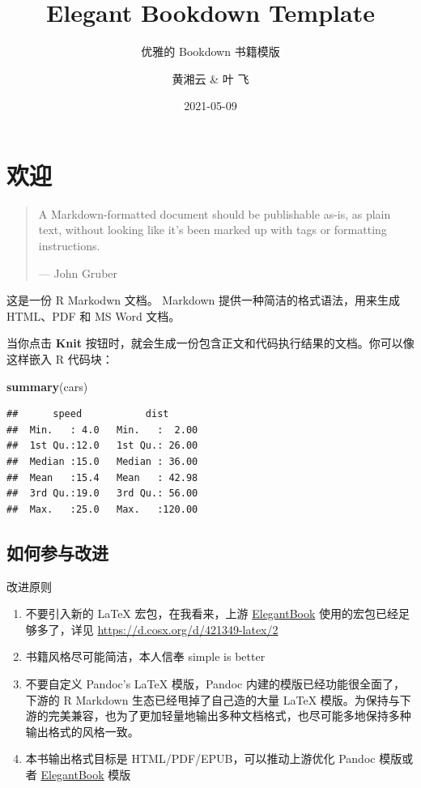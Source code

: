 \documentclass[
  lang=cn,
  11pt,
  scheme=chinese,
  chinesefont=nofont,
  citestyle=gb7714-2015,
  bibstyle=gb7714-2015]{elegantbook}
\institute{A bookdown wrapper for ElegantBook}
\title{Elegant Bookdown Template}
\subtitle{优雅的 Bookdown 书籍模版}
\author{黄湘云 \& 叶 飞}
\date{2021-05-09}
\newenvironment{Shaded}{\begin{snugshade}}{\end{snugshade}}
\newcommand{\KeywordTok}[1]{\textcolor[rgb]{0.13,0.29,0.53}{\textbf{#1}}}
\newcommand{\NormalTok}[1]{#1}
\begin{document}
\maketitle

{
\hypersetup{linkcolor=Maroon}
\setcounter{tocdepth}{2}
\tableofcontents
}
\listoftables
\listoffigures
\mainmatter

\hypertarget{welcome}{%
\chapter{欢迎}\label{welcome}}

\begin{quote}
A Markdown-formatted document should be publishable as-is, as plain text, without looking like it's been marked up with tags or formatting instructions.

\hspace*{\fill} --- John Gruber
\end{quote}

这是一份 R Markodwn 文档。 Markdown 提供一种简洁的格式语法，用来生成 HTML、PDF 和 MS Word 文档。

当你点击 \textbf{Knit} 按钮时，就会生成一份包含正文和代码执行结果的文档。你可以像这样嵌入 R 代码块：

\begin{Shaded}
\begin{Highlighting}[]
\KeywordTok{summary}\NormalTok{(cars)}
\end{Highlighting}
\end{Shaded}

\begin{verbatim}
##      speed           dist       
##  Min.   : 4.0   Min.   :  2.00  
##  1st Qu.:12.0   1st Qu.: 26.00  
##  Median :15.0   Median : 36.00  
##  Mean   :15.4   Mean   : 42.98  
##  3rd Qu.:19.0   3rd Qu.: 56.00  
##  Max.   :25.0   Max.   :120.00
\end{verbatim}

\hypertarget{pr}{%
\section{如何参与改进}\label{pr}}

改进原则

\begin{enumerate}
\def\labelenumi{\arabic{enumi}.}

\item
  不要引入新的 LaTeX 宏包，在我看来，上游 \href{https://github.com/ElegantLaTeX/ElegantBook}{ElegantBook} 使用的宏包已经足够多了，详见 \url{https://d.cosx.org/d/421349-latex/2}
\item
  书籍风格尽可能简洁，本人信奉 simple is better
\item
  不要自定义 Pandoc's LaTeX 模版，Pandoc 内建的模版已经功能很全面了，下游的 R Markdown 生态已经甩掉了自己造的大量 LaTeX 模版。为保持与下游的完美兼容，也为了更加轻量地输出多种文档格式，也尽可能多地保持多种输出格式的风格一致。
\item
  本书输出格式目标是 HTML/PDF/EPUB，可以推动上游优化 Pandoc 模版或者 \href{https://github.com/ElegantLaTeX/ElegantBook}{ElegantBook} 模版
\end{enumerate}
\end{document}
